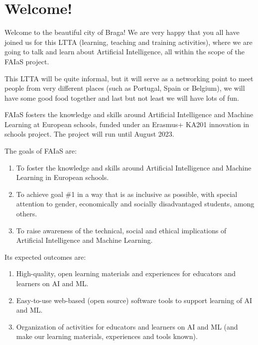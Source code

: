 \documentclass[11pt]{article}
\title{}
\author{}
\date{}
\begin{document}
\maketitle

\clearpage
\clearpage
\section*{Welcome!}
Welcome to the beautiful city of Braga! We are very happy that you all have joined us for this LTTA (learning, teaching and training activities), where we are going to talk and learn about Artificial Intelligence, all within the scope of the FAIaS project. 

This LTTA will be quite informal, but it will serve as a networking point to meet people from very different places (such as Portugal, Spain or Belgium), we will have some good food together and last but not least we will have lots of fun. 

FAIaS fosters the knowledge and skills around Artificial Intelligence and Machine Learning at European schools, funded under an Erasmus+ KA201 innovation in schools project. The project will run until August 2023.

The goals of FAIaS are: 
\begin{enumerate}
    \item To foster the knowledge and skills around Artificial Intelligence and Machine Learning in European schools.
    \item To achieve goal \#1 in a way that is as inclusive as possible, with special attention to gender, economically and socially disadvantaged students, among others. 
    \item To raise awareness of the technical, social and ethical implications of Artificial Intelligence and Machine Learning.
\end{enumerate}

Its expected outcomes are:
\begin{enumerate}
    \item High-quality, open learning materials and experiences for educators and learners on AI and ML.
    \item Easy-to-use web-based (open source) software tools to support learning of AI and ML.
    \item Organization of activities for educators and learners on AI and ML (and make our learning materials, experiences and tools known).
\end{enumerate}
\end{document}
